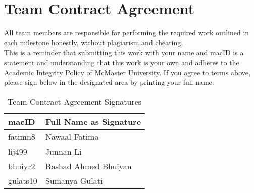 \documentclass[titlepage]{article}
\begin{document}
\newpage
\section{Team Contract Agreement}
All team members are responsible for performing the required work
outlined in each milestone honestly, without plagiarism and cheating.\\

This is a reminder that submitting this work with your name and macID is a statement 
and understanding that this work is your own and adheres to the Academic Integrity Policy 
of McMaster University. If you agree to terms above, please sign below in the designated 
area by printing your full name:
\begin{table}[H]
    \centering
    \begin{tabular}{|l|l|}
    \hline
    \textbf{macID} & \textbf{Full Name as Signature} \\ \hline
    fatimn8 & Nawaal Fatima          \\ \hline
    lij499  & Junnan Li                       \\ \hline
    bhuiyr2 &  Rashad Ahmed Bhuiyan                      \\ \hline
    gulats10 & Sumanya Gulati         \\ \hline
    \end{tabular}
    \caption{Team Contract Agreement Signatures}
    \label{tab:team-signatures}
    \end{table}
\end{document}
